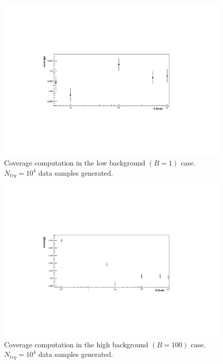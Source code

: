 \documentclass[10pt, oneside]{article}   	%
\begin{document}
\begin{figure}[h!]
    \centering
    \includegraphics[width=\textwidth]{Ex1_b1.pdf}
    \caption{Coverage computation in the low background $(B = 1)$ case. $N_{try} = 10^4$ data samples generated.}
    \label{fig:cov_b1}
\end{figure}

\begin{figure}[h!]
    \centering
    \includegraphics[width=\textwidth]{Ex1_b100.pdf}
    \caption{Coverage computation in the high background $(B = 100)$ case. $N_{try} = 10^4$ data samples generated.}
    \label{fig:cov_b100}
\end{figure}
\end{document}
